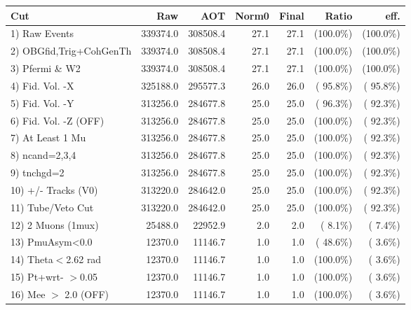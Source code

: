  \begin{table}[h!]\centering
 \begin{tabular}{||l||r|r|r|r|r|r||}
 \hline
 \hline
 Cut & Raw & AOT & Norm0 & Final & Ratio & eff.       \\
 \hline
  1) Raw Events           &     339374.0 &     308508.4 &         27.1 &         27.1 & (100.0\%) & (100.0\%) \\
  2) OBGfid,Trig+CohGenTh &     339374.0 &     308508.4 &         27.1 &         27.1 & (100.0\%) & (100.0\%) \\
  3) Pfermi \& W2         &     339374.0 &     308508.4 &         27.1 &         27.1 & (100.0\%) & (100.0\%) \\
  4) Fid. Vol. -X         &     325188.0 &     295577.3 &         26.0 &         26.0 & ( 95.8\%) & ( 95.8\%) \\
  5) Fid. Vol. -Y         &     313256.0 &     284677.8 &         25.0 &         25.0 & ( 96.3\%) & ( 92.3\%) \\
  6) Fid. Vol. -Z (OFF)   &     313256.0 &     284677.8 &         25.0 &         25.0 & (100.0\%) & ( 92.3\%) \\
  7) At Least 1 Mu        &     313256.0 &     284677.8 &         25.0 &         25.0 & (100.0\%) & ( 92.3\%) \\
  8) ncand=2,3,4          &     313256.0 &     284677.8 &         25.0 &         25.0 & (100.0\%) & ( 92.3\%) \\
  9) tnchgd=2             &     313256.0 &     284677.8 &         25.0 &         25.0 & (100.0\%) & ( 92.3\%) \\
 10) +/- Tracks (V0)      &     313220.0 &     284642.0 &         25.0 &         25.0 & (100.0\%) & ( 92.3\%) \\
 11) Tube/Veto Cut        &     313220.0 &     284642.0 &         25.0 &         25.0 & (100.0\%) & ( 92.3\%) \\
 12) 2 Muons (1mux)       &      25488.0 &      22952.9 &          2.0 &          2.0 & (  8.1\%) & (  7.4\%) \\
 13) PmuAsym<0.0          &      12370.0 &      11146.7 &          1.0 &          1.0 & ( 48.6\%) & (  3.6\%) \\
 14) Theta$<$2.62 rad     &      12370.0 &      11146.7 &          1.0 &          1.0 & (100.0\%) & (  3.6\%) \\
 15) Pt+wrt- $>$0.05      &      12370.0 &      11146.7 &          1.0 &          1.0 & (100.0\%) & (  3.6\%) \\
 16) Mee $>$ 2.0  (OFF)   &      12370.0 &      11146.7 &          1.0 &          1.0 & (100.0\%) & (  3.6\%) \\

\end{tabular}
\end{table}
